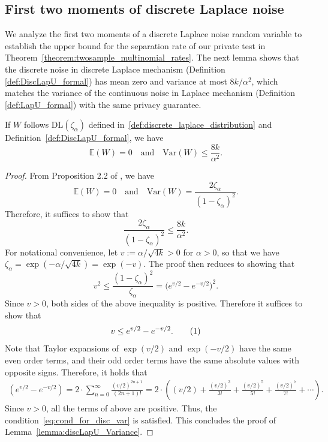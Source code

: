 \documentclass[twoside,11pt]{article}
\newcommand\numberthis{\addtocounter{equation}{1}\tag{\theequation}}
\newcommand{\alphabetSize}{k} %
\newcommand{\privacyParameter}{\alpha} %
\newcommand{\distparamDiscLap}{\zeta}%
\newcommand{\discLapUParam}{\distparamDiscLap_{\privacyParameter}}
\begin{document}
\begin{appendix}
	\subsection{First two moments of discrete Laplace noise}\label{proof:discLapUVar}
	We analyze the first two moments of a discrete Laplace noise random variable to establish the upper bound for the separation rate of our private test in Theorem~\ref{theorem:twosample_multinomial_rates}. The next lemma shows that the discrete noise in discrete Laplace mechanism (Definition \ref{def:DiscLapU_formal}) has mean zero and variance at most $8\alphabetSize/\privacyParameter^2$, which matches the variance of the continuous noise in Laplace mechanism (Definition \ref{def:LapU_formal}) with the same privacy guarantee.
	\begin{lemma}\label{lemma:discLapU_Variance}
		If $W$ follows $ \mathrm{DL}(\discLapUParam)$ defined in~\eqref{def:discrete_laplace_distribution} and Definition~\ref{def:DiscLapU_formal}, we have
		$$
		\mathbb{E}(W) = 0\quad \text{and} \quad\mathrm{Var}(W) \leq \frac{8\alphabetSize}{\privacyParameter^2}.
		$$
		\begin{proof}
			From Proposition 2.2 of \citet{inusah_discrete_2006}, we have
			$$\mathbb{E}(W) = 0
			\quad \text{and} \quad
			\mathrm{Var}(W) = \frac{2\discLapUParam}{(1-\discLapUParam)^2}.$$
			Therefore, it suffices to show that
			$$ \frac{2\discLapUParam}{(1-\discLapUParam)^2} \leq \frac{8\alphabetSize}{\privacyParameter^2}.$$
			For notational convenience, let $v :=  \privacyParameter/\sqrt{4\alphabetSize}>0$ for $\privacyParameter>0$, so that we have $
			\discLapUParam
			=
			\exp({
				-
				\privacyParameter/\sqrt{4\alphabetSize}
			})
			=
			\exp({-v}).$
			The proof then reduces to showing that
			$$
			v^2
			\leq
			\frac{(1 - \discLapUParam)^2}{\discLapUParam} = 
			\bigl(
			e^{v/2} - e^{-v/2}
			\bigr)^2.
			$$
			Since $v>0$, both sides of the above inequality is positive. Therefore it suffices to show that
			\begin{align*}
				v \leq 
				e^{v/2} - e^{-v/2}.
				\numberthis \label{eq:cond_for_disc_var}
			\end{align*}
			Note that Taylor expansions of $\exp(v/2)$ and $\exp(-v/2)$ have the same even order terms, and their odd order terms have the same absolute values with opposite signs. Therefore, it holds that
			\begin{align*}
				(e^{v/2} - e^{-v/2} ) = 2 \cdot \sum_{n=0}^{\infty} \frac{\left(v/2\right)^{2n+1}}{(2n+1)!} = 
				2\cdot
				\left(
				(v/2)
				+ 
				\frac{(v/2)^3}{3!}
				+
				\frac{(v/2)^5}{5!}
				+
				\frac{(v/2)^7}{7!}
				+ \cdots 
				\right).
			\end{align*}
			Since $v>0$, all the terms of above are positive. Thus, the condition~\eqref{eq:cond_for_disc_var} is satisfied. This concludes the proof of Lemma~\ref{lemma:discLapU_Variance}. 
		\end{proof}
	\end{lemma}
	

\end{appendix}
\end{document}
